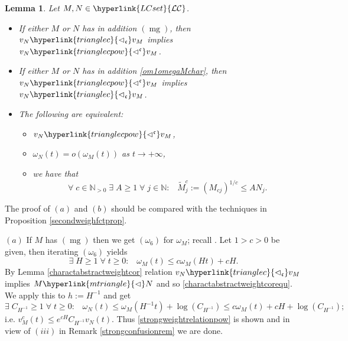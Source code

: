 \documentclass[10pt]{amsart}%
\numberwithin{equation}{section}
\theoremstyle{plain}
\newtheorem{lemma}[proposition]{Lemma}
\newcommand{\NN}{\mathbb{N}}
\let\on=\operatorname
\begin{document}
\begin{lemma}\label{charactabstractweightcor1}
	Let $M,N\in\hyperlink{LCset}{\mathcal{LC}}$.
	\begin{itemize}
		\item[$(a)$] If either $M$ or $N$ has in addition \hyperlink{mg}{$(\on{mg})$}, then $v_N\hyperlink{trianglec}{\vartriangleleft_{\mathfrak{c}}}v_M$ implies $v_N\hyperlink{trianglecpow}{\vartriangleleft^{\mathfrak{c}}}v_M$.
		
		\item[$(b)$] If either $M$ or $N$ has in addition \eqref{om1omegaMchar}, then $v_N\hyperlink{trianglecpow}{\vartriangleleft^{\mathfrak{c}}}v_M$ implies $v_N\hyperlink{trianglec}{\vartriangleleft_{\mathfrak{c}}}v_M$.
		
		\item[$(c)$] The following are equivalent:
		\begin{itemize}
			\item[$(i)$] $v_N\hyperlink{trianglecpow}{\vartriangleleft^{\mathfrak{c}}}v_M$,
			
			\item[$(ii)$] $\omega_N(t)=o(\omega_M(t))$ as $t\rightarrow+\infty$,
			
			\item[$(iii)$] we have that
			\begin{equation}\label{tildestrong}
				\forall\;c\in\NN_{>0}\;\exists\;A\ge 1\;\forall\;j\in\NN:\;\;\;\widetilde{M}^c_j:=(M_{cj})^{1/c}\le AN_j.
			\end{equation}
		\end{itemize}
	\end{itemize}
\end{lemma}

The proof of $(a)$ and $(b)$ should be compared with the techniques in Proposition \ref{secondweighfctprop}.

$(a)$ If $M$ has \hyperlink{mg}{$(\on{mg})$} then we get \hyperlink{om6}{$(\omega_6)$} for $\omega_M$; recall \cite[Prop. 3.6]{Komatsu73}. Let $1>c>0$ be given, then iterating \hyperlink{om6}{$(\omega_6)$} yields
$$\exists\;H\ge 1\;\forall\;t\ge 0:\;\;\;\omega_M(t)\le c\omega_M(Ht)+cH.$$
By Lemma \ref{charactabstractweightcor} relation $v_N\hyperlink{trianglec}{\vartriangleleft_{\mathfrak{c}}}v_M$ implies $M\hyperlink{mtriangle}{\vartriangleleft}N$ and so \eqref{charactabstractweightcorequ}. We apply this to $h:=H^{-1}$ and get
$$\exists\;C_{H^{-1}}\ge 1\;\forall\;t\ge 0:\;\;\;\omega_N(t)\le\omega_M(H^{-1}t)+\log(C_{H^{-1}})\le c\omega_M(t)+cH+\log(C_{H^{-1}});$$
i.e. $v^c_M(t)\le e^{cH}C_{H^{-1}}v_N(t)$. Thus \eqref{strongweightrelationpow} is shown and in view of $(iii)$ in Remark \ref{strongconfusionrem} we are done.
\end{document}
